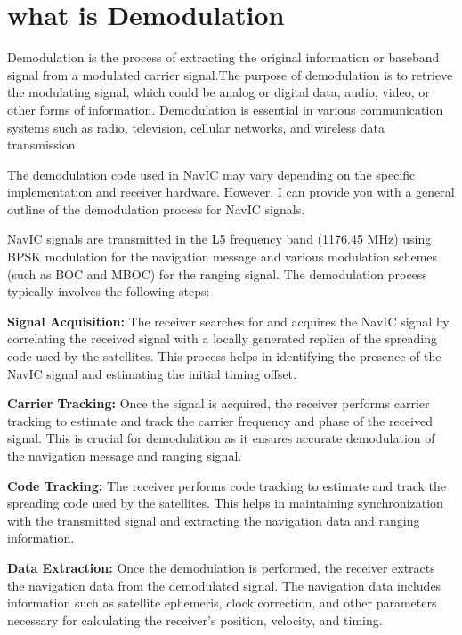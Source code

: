 %


\section{what is Demodulation}

Demodulation is the process of extracting the original information or baseband signal from a modulated carrier signal.The purpose of demodulation is to retrieve the modulating signal, which could be analog or digital data, audio, video, or other forms of information. Demodulation is essential in various communication systems such as radio, television, cellular networks, and wireless data transmission.


The demodulation code used in NavIC may vary depending on the specific implementation and receiver hardware. However, I can provide you with a general outline of the demodulation process for NavIC signals.

NavIC signals are transmitted in the L5 frequency band (1176.45 MHz) using BPSK modulation for the navigation message and various modulation schemes (such as BOC and MBOC) for the ranging signal. The demodulation process typically involves the following steps:

\textbf{Signal Acquisition:} The receiver searches for and acquires the NavIC signal by correlating the received signal with a locally generated replica of the spreading code used by the satellites. This process helps in identifying the presence of the NavIC signal and estimating the initial timing offset.

\textbf{Carrier Tracking:} Once the signal is acquired, the receiver performs carrier tracking to estimate and track the carrier frequency and phase of the received signal. This is crucial for demodulation as it ensures accurate demodulation of the navigation message and ranging signal.

\textbf{Code Tracking:} The receiver performs code tracking to estimate and track the spreading code used by the satellites. This helps in maintaining synchronization with the transmitted signal and extracting the navigation data and ranging information.

\textbf{Data Extraction:} Once the demodulation is performed, the receiver extracts the navigation data from the demodulated signal. The navigation data includes information such as satellite ephemeris, clock correction, and other parameters necessary for calculating the receiver's position, velocity, and timing.

